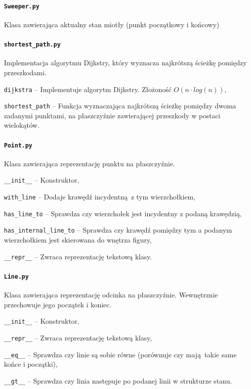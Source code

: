 \documentclass[12pt]{article}
\let\tempone\itemize
\let\temptwo\enditemize
\renewenvironment{itemize}{\tempone\setlength{\itemsep}{0cm}}{\temptwo}
\begin{document}
	\paragraph{\lstinline|Sweeper.py|}
		Klasa zawierająca aktualny stan miotły (punkt początkowy i końcowy)
	
	\paragraph{\lstinline|shortest_path.py|}
		Implementacja algorytmu Dijkstry, który wyznacza najkrótszą ścieżkę pomiędzy przeszkodami.
		\begin{itemize}
			\item \lstinline|dijkstra| -- Implementuje algorytm Dijkstry. Złożoność $ O(n \cdot log(n)) $,
			\item \lstinline|shortest_path| -- Funkcja wyznaczająca najkrótszą ścieżkę pomiędzy dwoma zadanymi punktami, na płaszczyźnie zawierającej przeszkody w postaci wielokątów.
		\end{itemize}
	
	\paragraph{\lstinline|Point.py|}
		Klasa zawierająca reprezentację punktu na płaszczyźnie.
		\begin{itemize}
			\item \lstinline|__init__| -- Konstruktor,
			\item \lstinline|with_line| -- Dodaje krawędź incydentną z tym wierzchołkiem,
			\item \lstinline|has_line_to| -- Sprawdza czy wierzchołek jest incydentny z podaną krawędzią,
			\item \lstinline|has_internal_line_to| -- Sprawdza czy krawędź pomiędzy tym a podanym wierzchołkiem jest skierowana do wnętrza figury, 
			\item \lstinline|__repr__| -- Zwraca reprezentację tekstową klasy.
		\end{itemize}
	
	\paragraph{\lstinline|Line.py|}
		Klasa zawierająca reprezentację odcinka na płaszczyźnie. Wewnętrznie przechowuje jego początek i koniec.
		\begin{itemize}
			\item \lstinline|__init__| -- Konstruktor,
			\item \lstinline|__repr__| -- Zwraca reprezentację tekstową klasy,
			\item \lstinline|__eq__| -- Sprawdza czy linie są sobie równe (porównuje czy mają takie same końce i początki),
			\item \lstinline|__gt__| -- Sprawdza czy linia następuje po podanej linii w strukturze stanu.
		\end{itemize}
	
\end{document}
